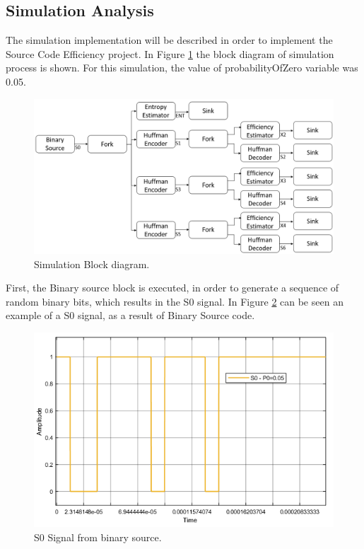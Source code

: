 \begin{refsection}
\subsection{Simulation Analysis}

The simulation implementation will be described in order to implement the Source Code Efficiency project. In Figure \ref{f:simulationdiagram} the block diagram of simulation process is shown.
For this simulation, the value of probabilityOfZero variable was 0.05.

\begin{figure}[!h]
\centering
\includegraphics[width=6in]{./sdf/eit_45550_estimator_source_code_efficiency/figures/simulationdiagram.png}
\caption[Simulation Block diagram.]{Simulation Block diagram.}
\label{f:simulationdiagram}
\end{figure}

First, the Binary source block is executed, in order to generate a sequence of random binary bits, which results in the S0 signal. In Figure \ref{f:S0} can be seen an example of a S0 signal, as a result of Binary Source code.


\begin{figure}[!h]
\centering
\includegraphics[width=5in]{./sdf/eit_45550_estimator_source_code_efficiency/figures/S0.png}
\caption[S0 Signal from binary source.]{S0 Signal from binary source.}
\label{f:S0}
\end{figure}


\end{refsection}
